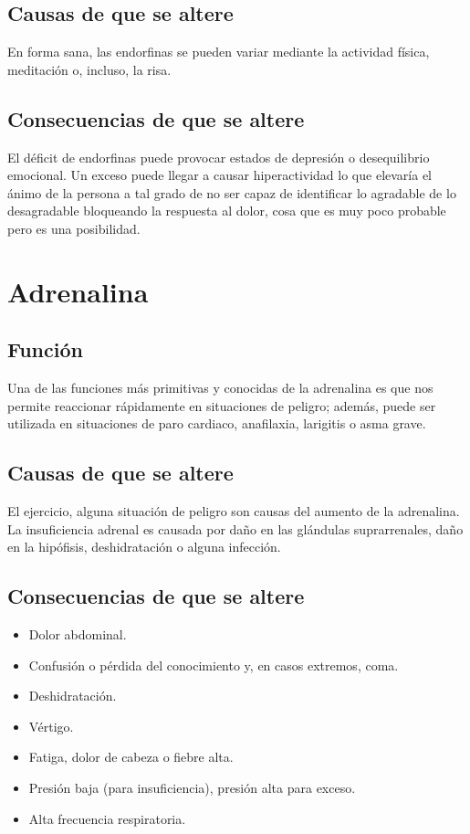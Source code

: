 \begin{multicols}{2}
\subsection*{Causas de que se altere}
En forma sana, las endorfinas se pueden variar mediante la actividad física, meditación o, incluso, la risa.
\subsection*{Consecuencias de que se altere}
El déficit de endorfinas puede provocar estados de depresión o desequilibrio emocional. Un exceso puede llegar a causar hiperactividad lo que elevaría el ánimo de la persona a tal grado de no ser capaz de identificar lo agradable de lo desagradable bloqueando la respuesta al dolor, cosa que es muy poco probable pero es una posibilidad.



\section*{Adrenalina}
\subsection*{Función}
Una de las funciones más primitivas y conocidas de la adrenalina es que nos permite reaccionar rápidamente en situaciones de peligro; además, puede ser utilizada en situaciones de paro cardiaco, anafilaxia, larigitis o asma grave.
\subsection*{Causas de que se altere}
El ejercicio, alguna situación de peligro son causas del aumento de la adrenalina. La insuficiencia adrenal es causada por daño en las glándulas suprarrenales, daño en la hipófisis, deshidratación o alguna infección.
\subsection*{Consecuencias de que se altere}
\begin{itemize}
	\item Dolor abdominal.
	\item Confusión o pérdida del conocimiento y, en casos extremos, coma.
	\item Deshidratación.
	\item Vértigo.
	\item Fatiga, dolor de cabeza o fiebre alta.
	\item Presión baja (para insuficiencia), presión alta para exceso.
	\item Alta frecuencia respiratoria.
\end{itemize}





\end{multicols}
